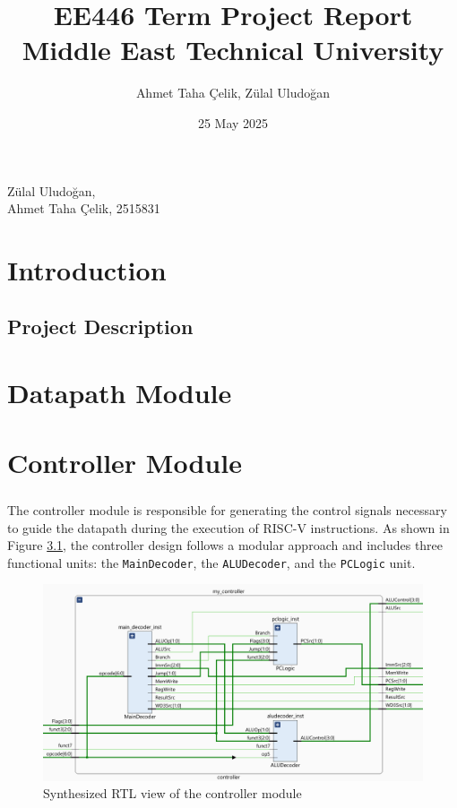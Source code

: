 \documentclass[12pt]{report}
\title{EE446 Term Project Report \\ Middle East Technical University}
\author{Ahmet Taha Çelik, Zülal Uludoğan}
\date{25 May 2025}
\makeatletter
\renewcommand{\maketitle}{
\begin{center}

\pagestyle{empty}
\phantom{.}  %
\vspace{0.5cm}

{\Huge \bf \@title\par}
\vspace{5cm}

{\LARGE Zülal Uludoğan, }\\[0.5cm]
{\LARGE Ahmet Taha Çelik, 2515831}

\vfill

{\Large\@date}

\end{center}
}\makeatother
\makeatother
\begin{document}
\maketitle
\tableofcontents

\chapter{Introduction}

\section{Project Description}


\chapter{Datapath Module}


\chapter{Controller Module}

\paragraph{}
The controller module is responsible for generating the control signals necessary to guide the datapath during the execution of RISC-V instructions. As shown in Figure \ref{fig:controller}, the controller design follows a modular approach and includes three functional units: the \texttt{MainDecoder}, the \texttt{ALUDecoder}, and the \texttt{PCLogic} unit.

\begin{figure}[h]
    \centering
    \includegraphics[width=\textwidth]{figures/controller_rtl.png}
    \caption{Synthesized RTL view of the controller module}
    \label{fig:controller}
\end{figure}
\end{document}
